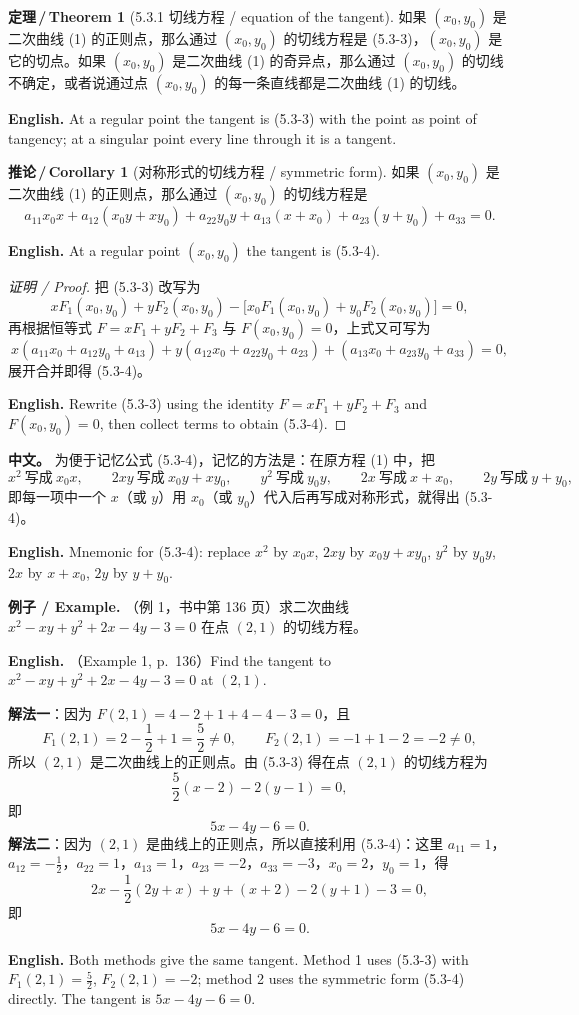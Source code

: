 \documentclass[UTF8,11pt,a4paper]{ctexart}
\newcommand{\APS}[2]{\par\noindent\textbf{中文。} #1\par\noindent\textbf{English.} #2\par\smallskip}
\newcommand{\EN}[1]{\par\noindent \textbf{English.} #1\par}
\newcommand{\EX}[2]{\par\noindent \textbf{例子 / Example.} #1\par\EN{#2}}
\theoremstyle{definition}
\newtheorem*{theorem}{定理\,/\,Theorem}
\newtheorem*{corollary}{推论\,/\,Corollary}
\begin{document}
\begin{theorem}[5.3.1 切线方程 / equation of the tangent]\label{thm:tangent}
如果 $(x_0,y_0)$ 是二次曲线 (1) 的正则点，那么通过 $(x_0,y_0)$ 的切线方程是 (5.3-3)，$(x_0,y_0)$ 是它的切点。如果 $(x_0,y_0)$ 是二次曲线 (1) 的奇异点，那么通过 $(x_0,y_0)$ 的切线不确定，或者说通过点 $(x_0,y_0)$ 的每一条直线都是二次曲线 (1) 的切线。
\EN{At a regular point the tangent is (5.3-3) with the point as point of tangency; at a singular point every line through it is a tangent.}
\end{theorem}

\begin{corollary}[对称形式的切线方程 / symmetric form]\label{cor:tangent-sym}
如果 $(x_0,y_0)$ 是二次曲线 (1) 的正则点，那么通过 $(x_0,y_0)$ 的切线方程是
\[
a_{11}x_0x+a_{12}(x_0y+xy_0)+a_{22}y_0y+a_{13}(x+x_0)+a_{23}(y+y_0)+a_{33}=0.\tag{5.3-4}
\]
\EN{At a regular point $(x_0,y_0)$ the tangent is (5.3-4).}
\end{corollary}

\begin{proof}[证明 / Proof]
把 (5.3-3) 改写为
\[
xF_1(x_0,y_0)+yF_2(x_0,y_0)-\bigl[x_0F_1(x_0,y_0)+y_0F_2(x_0,y_0)\bigr]=0,
\]
再根据恒等式 $F=xF_1+yF_2+F_3$ 与 $F(x_0,y_0)=0$，上式又可写为
\[
x(a_{11}x_0+a_{12}y_0+a_{13})+y(a_{12}x_0+a_{22}y_0+a_{23})+(a_{13}x_0+a_{23}y_0+a_{33})=0,
\]
展开合并即得 (5.3-4)。
\EN{Rewrite (5.3-3) using the identity $F=xF_1+yF_2+F_3$ and $F(x_0,y_0)=0$, then collect terms to obtain (5.3-4).}
\end{proof}

\APS{为便于记忆公式 (5.3-4)，记忆的方法是：在原方程 (1) 中，把
\[
x^2\ \text{写成}\ x_0x,\qquad 2xy\ \text{写成}\ x_0y+xy_0,\qquad y^2\ \text{写成}\ y_0y,\qquad 2x\ \text{写成}\ x+x_0,\qquad 2y\ \text{写成}\ y+y_0,
\]
即每一项中一个 $x$（或 $y$）用 $x_0$（或 $y_0$）代入后再写成对称形式，就得出 (5.3-4)。}{Mnemonic for (5.3-4): replace $x^2$ by $x_0x$, $2xy$ by $x_0y+xy_0$, $y^2$ by $y_0y$, $2x$ by $x+x_0$, $2y$ by $y+y_0$.}

\EX{（例 1，书中第 136 页）求二次曲线 $x^2-xy+y^2+2x-4y-3=0$ 在点 $(2,1)$ 的切线方程。}{（Example 1, p.~136）Find the tangent to $x^2-xy+y^2+2x-4y-3=0$ at $(2,1)$.}
\textbf{解法一}：因为 $F(2,1)=4-2+1+4-4-3=0$，且
\[
F_1(2,1)=2-\frac12+1=\frac52\ne0,\qquad F_2(2,1)=-1+1-2=-2\ne0,
\]
所以 $(2,1)$ 是二次曲线上的正则点。由 (5.3-3) 得在点 $(2,1)$ 的切线方程为
\[
\frac52(x-2)-2(y-1)=0,
\]
即
\[
5x-4y-6=0.
\]
\textbf{解法二}：因为 $(2,1)$ 是曲线上的正则点，所以直接利用 (5.3-4)：这里 $a_{11}=1$，$a_{12}=-\frac12$，$a_{22}=1$，$a_{13}=1$，$a_{23}=-2$，$a_{33}=-3$，$x_0=2$，$y_0=1$，得
\[
2x-\frac12(2y+x)+y+(x+2)-2(y+1)-3=0,
\]
即
\[
5x-4y-6=0.
\]
\EN{Both methods give the same tangent. Method 1 uses (5.3-3) with $F_1(2,1)=\tfrac52$, $F_2(2,1)=-2$; method 2 uses the symmetric form (5.3-4) directly. The tangent is $5x-4y-6=0$.}
\end{document}
